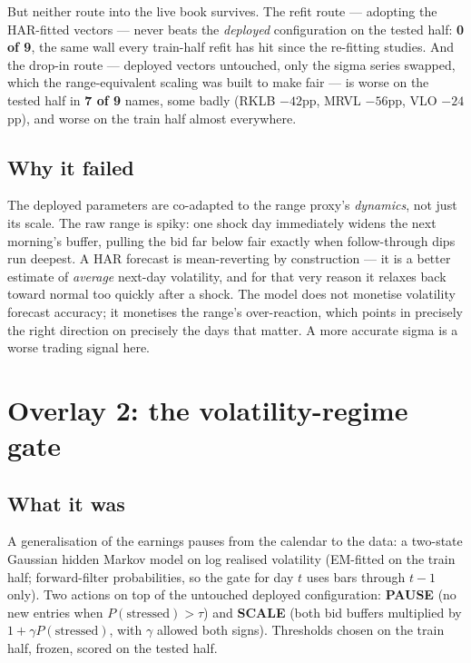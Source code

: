 \documentclass[11pt,a4paper]{article}
\newcommand{\bad}[1]{{\color{bcred}\textbf{#1}}}
\begin{document}
But neither route into the live book survives. The refit route --- adopting the
HAR-fitted vectors --- never beats the \emph{deployed} configuration on the tested
half: \bad{0 of 9}, the same wall every train-half refit has hit since the
re-fitting studies. And the drop-in route --- deployed vectors untouched, only the
sigma series swapped, which the range-equivalent scaling was built to make fair
--- is worse on the tested half in \bad{7 of 9} names, some badly (RKLB
$-42$pp, MRVL $-56$pp, VLO $-24$pp), and worse on the train half almost
everywhere.

\subsection{Why it failed}

The deployed parameters are co-adapted to the range proxy's \emph{dynamics}, not
just its scale. The raw range is spiky: one shock day immediately widens the next
morning's buffer, pulling the bid far below fair exactly when follow-through dips
run deepest. A HAR forecast is mean-reverting by construction --- it is a better
estimate of \emph{average} next-day volatility, and for that very reason it
relaxes back toward normal too quickly after a shock. The model does not monetise
volatility forecast accuracy; it monetises the range's over-reaction, which
points in precisely the right direction on precisely the days that matter.
A more accurate sigma is a worse trading signal here.

\section{Overlay 2: the volatility-regime gate}

\subsection{What it was}

A generalisation of the earnings pauses from the calendar to the data: a
two-state Gaussian hidden Markov model on log realised volatility (EM-fitted on
the train half; forward-filter probabilities, so the gate for day $t$ uses bars
through $t-1$ only). Two actions on top of the untouched deployed configuration:
\textbf{PAUSE} (no new entries when $P(\text{stressed}) > \tau$) and
\textbf{SCALE} (both bid buffers multiplied by $1 + \gamma P(\text{stressed})$,
with $\gamma$ allowed both signs). Thresholds chosen on the train half, frozen,
scored on the tested half.
\end{document}
